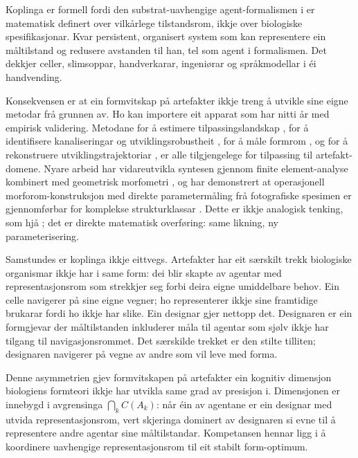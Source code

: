 \documentclass[10pt,a4paper,twocolumn]{article}
\begin{document}
Koplinga er formell fordi den substrat-uavhengige agent-formalismen i \citet{fieldslevin2022} er matematisk definert over vilkårlege tilstandsrom, ikkje over biologiske spesifikasjonar. Kvar persistent, organisert system som kan representere ein måltilstand og redusere avstanden til han, tel som agent i formalismen. Det dekkjer celler, slimsoppar, handverkarar, ingeniørar og språkmodellar i éi handvending.

Konsekvensen er at ein formvitskap på artefakter ikkje treng å utvikle sine eigne metodar frå grunnen av. Ho kan importere eit apparat som har nitti år med empirisk validering. Metodane for å estimere tilpassingslandskap \citep{wright1932, lande1979, arnold2001}, for å identifisere kanaliseringar og utviklingsrobustheit \citep{waddington1957, wagner2005}, for å måle formrom \citep{raup1966, mitteroecker2009, mcghee2007}, og for å rekonstruere utviklingstrajektoriar \citep{gould1977, arthur2004}, er alle tilgjengelege for tilpassing til artefakt-domene. Nyare arbeid har vidareutvikla syntesen gjennom finite element-analyse kombinert med geometrisk morfometri \citep{polly2016}, og har demonstrert at operasjonell morforom-konstruksjon med direkte parametermåling frå fotografiske spesimen er gjennomførbar for komplekse strukturklassar \citep{contrerasfigueroa2023}. Dette er ikkje analogisk tenking, som hjå \citet{steadman1979}; det er direkte matematisk overføring: same likning, ny parameterisering.

Samstundes er koplinga ikkje eittvegs. Artefakter har eit særskilt trekk biologiske organismar ikkje har i same form: dei blir skapte av agentar med representasjonsrom som strekkjer seg forbi deira eigne umiddelbare behov. Ein celle navigerer på sine eigne vegner; ho representerer ikkje sine framtidige brukarar fordi ho ikkje har slike. Ein designar gjer nettopp det. Designaren er ein formgjevar der måltilstanden inkluderer måla til agentar som sjølv ikkje har tilgang til navigasjonsrommet. Det særskilde trekket er den stilte tilliten; designaren navigerer på vegne av andre som vil leve med forma.

Denne asymmetrien gjev formvitskapen på artefakter ein kognitiv dimensjon biologiens formteori ikkje har utvikla same grad av presisjon i. Dimensjonen er innebygd i avgrensinga $\bigcap_k C(A_k)$: når éin av agentane er ein designar med utvida representasjonsrom, vert skjeringa dominert av designaren si evne til å representere andre agentar sine måltilstandar. Kompetansen hennar ligg i å koordinere uavhengige representasjonsrom til eit stabilt form-optimum.
\end{document}
